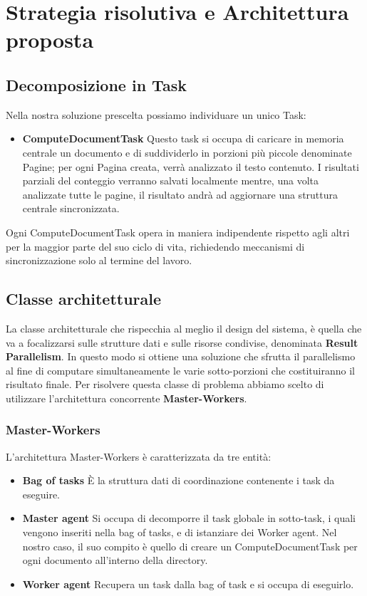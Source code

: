 \chapter{Strategia risolutiva e Architettura proposta}

\section{Decomposizione in Task}
Nella nostra soluzione prescelta possiamo individuare un unico Task:
\begin{itemize}
    \item \textbf{ComputeDocumentTask} \newline
    Questo task si occupa di caricare in memoria centrale un documento e di suddividerlo in porzioni più piccole denominate Pagine; per ogni Pagina creata, verrà analizzato il testo contenuto. I risultati parziali del conteggio verranno salvati localmente mentre, una volta analizzate tutte le pagine, il risultato andrà ad aggiornare una struttura centrale sincronizzata.
\end{itemize}

\noindent Ogni ComputeDocumentTask opera in maniera indipendente rispetto agli altri per la maggior parte del suo ciclo di vita, richiedendo meccanismi di sincronizzazione solo al termine del lavoro.

\section{Classe architetturale}
La classe architetturale che rispecchia al meglio il design del sistema, è quella che va a focalizzarsi sulle strutture dati e sulle risorse condivise, denominata \textbf{Result Parallelism}. In questo modo si ottiene una soluzione che sfrutta il parallelismo al fine di computare simultaneamente le varie sotto-porzioni che costituiranno il risultato finale. Per risolvere questa classe di problema abbiamo scelto di utilizzare l'architettura concorrente \textbf{Master-Workers}.

\subsection{Master-Workers}
L'architettura Master-Workers è caratterizzata da tre entità:
\begin{itemize}
    \item \textbf{Bag of tasks} \newline
    \`E la struttura dati di coordinazione contenente i task da eseguire.
    \item \textbf{Master agent} \newline
    Si occupa di decomporre il task globale in sotto-task, i quali vengono inseriti nella bag of tasks, e di istanziare dei Worker agent. Nel nostro caso, il suo compito è quello di creare un ComputeDocumentTask per ogni documento all'interno della directory.
    \item \textbf{Worker agent} \newline
    Recupera un task dalla bag of task e si occupa di eseguirlo.
\end{itemize}


